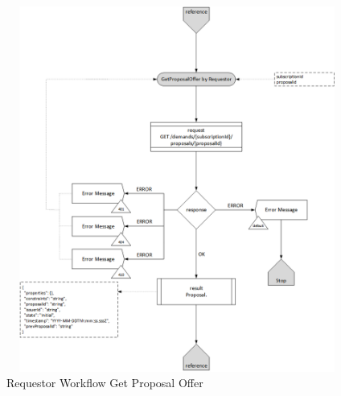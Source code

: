 \begin{enumerate}
\begin{figure}[H]
    \centering
    \includegraphics[width=12cm,height=12cm,angle=0]{./diag/Workflow/Market/GetProposalOffer-R-Workflow.png}
    \caption{Requestor Workflow Get Proposal Offer }
	\label{fig:GPO}
\end{figure}


\end{enumerate}

\newpage


